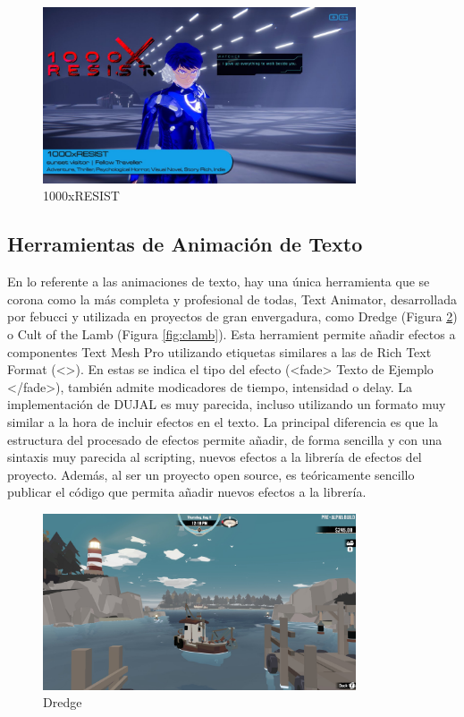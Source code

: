 \begin{figure}[H]
  \centering
  \includegraphics[width=350px,clip=true]{100xresist.png}
  \caption{1000xRESIST}
  \label{fig:1000xResist}
\end{figure}

 \subsection{Herramientas de Animación de Texto}
En lo referente a las animaciones de texto, hay una única herramienta que se corona como la más completa y profesional de todas, Text Animator\cite{TextAnimator}, desarrollada por febucci y utilizada en proyectos
 de gran envergadura, como Dredge (Figura \ref{fig:dredge}) o Cult of the Lamb (Figura \ref{fig:clamb}). Esta herramient permite añadir efectos a componentes Text Mesh Pro utilizando etiquetas similares a las de 
 Rich Text Format (<>). En estas se indica el tipo del efecto (<fade> Texto de Ejemplo </fade>), también admite modicadores de tiempo, intensidad o delay. La implementación de DUJAL es muy parecida, incluso utilizando 
 un formato muy similar a la hora de incluir efectos en el texto. La principal diferencia es que la estructura del procesado de efectos permite añadir, de forma sencilla y con una sintaxis muy parecida al scripting, 
 nuevos efectos a la librería de efectos del proyecto. Además, al ser un proyecto open source, es teóricamente sencillo publicar el código que permita añadir nuevos efectos a la librería.

\begin{figure}[H]
  \centering
  \includegraphics[width=350px,clip=true]{dredge.png}
  \caption{Dredge}
  \label{fig:dredge}
\end{figure}

